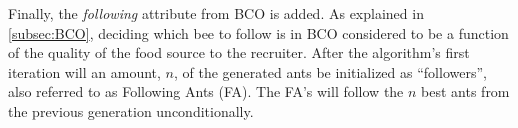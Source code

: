 Finally, the \textit{following} attribute from BCO is added. As explained in \vref{subsec:BCO}, deciding which bee to follow is in BCO considered to be a function of the quality of the food source to the recruiter. After the algorithm's first iteration will an amount, $n$, of the generated ants be initialized as ``followers'', also referred to as Following Ants (FA). The FA's will follow the $n$ best ants from the previous generation unconditionally. %





